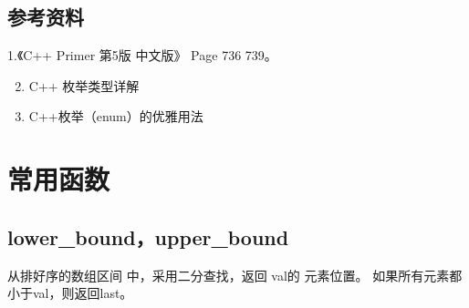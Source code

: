 \documentclass[letterpaper,10pt,english]{sphinxmanual}
\begin{document}
\subsection{参考资料}
\label{\detokenize{cpp/17_enum:id4}}
1.《C++ Primer 第5版 中文版》 Page 736 \textendash{} 739。
\begin{enumerate}
\setcounter{enumi}{1}
\item {} 
C++ 枚举类型详解

\end{enumerate}
\begin{quote}

\end{quote}
\begin{enumerate}
\setcounter{enumi}{2}
\item {} 
C++枚举（enum）的优雅用法

\end{enumerate}
\begin{quote}

\end{quote}


\section{常用函数}
\label{\detokenize{cpp/18_commonFunc::doc}}\label{\detokenize{cpp/18_commonFunc:id1}}

\subsection{lower\_bound，upper\_bound}
\label{\detokenize{cpp/18_commonFunc:lower-bound-upper-bound}}
%
\begin{sphinxVerbatim}[commandchars=\\\{\}]
 
\end{sphinxVerbatim}

 从排好序的数组区间 \sphinxstylestrong{{[}first,last)} 中，采用二分查找，返回  val的  元素位置。
如果所有元素都小于val，则返回last。

%
\begin{sphinxVerbatim}[commandchars=\\\{\}]
    
        
\end{sphinxVerbatim}
\end{document}
